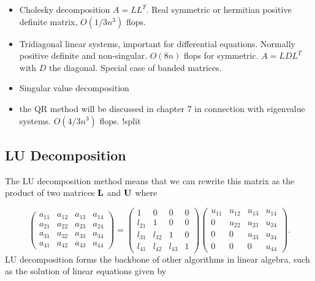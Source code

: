 \documentclass[%
twoside,                 %
final,                   %
10pt]{article}
\begin{document}
{{{{\begin{itemize}
  \item Cholesky decomposition $A=LL^T$. Real symmetric or hermitian positive definite matrix, $O(1/3n^3)$ flops.

  \item Tridiagonal linear systems, important for differential equations. Normally positive definite and non-singular. $O(8n)$ flops for symmetric. $A=LDL^T$ with $D$ the diagonal. Special case of banded matrices.

  \item Singular value decomposition

  \item the QR method will be discussed in chapter 7 in connection with eigenvalue systems. $O(4/3n^3)$ flops. !split
\end{itemize}

\noindent
\subsection{LU Decomposition}

The LU decomposition method means that we can rewrite
this matrix as the product of two matrices ${\bf L}$ and ${\bf U}$
where

\[
\label{eq3}
   \left(\begin{array}{cccc}
                          a_{11} & a_{12} & a_{13} & a_{14} \\
                          a_{21} & a_{22} & a_{23} & a_{24} \\
                          a_{31} & a_{32} & a_{33} & a_{34} \\
                          a_{41} & a_{42} & a_{43} & a_{44}
                      \end{array} \right)
                      = \left( \begin{array}{cccc}
                              1  & 0      & 0      & 0 \\
                          l_{21} & 1      & 0      & 0 \\
                          l_{31} & l_{32} & 1      & 0 \\
                          l_{41} & l_{42} & l_{43} & 1
                      \end{array} \right)
                        \left( \begin{array}{cccc}
                          u_{11} & u_{12} & u_{13} & u_{14} \\
                               0 & u_{22} & u_{23} & u_{24} \\
                               0 & 0      & u_{33} & u_{34} \\
                               0 & 0      &  0     & u_{44}
             \end{array} \right).
\]
LU decomposition forms the backbone of other algorithms in linear algebra, such as the
solution of linear equations given by

}}}}
\end{document}
